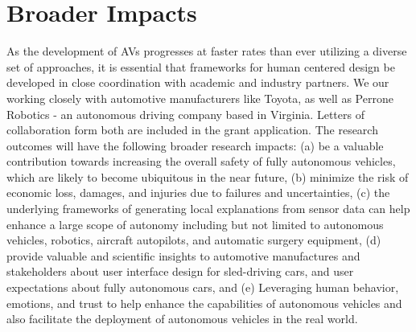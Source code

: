 

\section{Broader Impacts}
\label{sec:broader}

As the development of AVs progresses at faster rates than ever utilizing a diverse set of approaches, it is essential that frameworks for human centered design be developed in close coordination with academic and industry partners. 
We our working closely with automotive manufacturers like Toyota, as well as Perrone Robotics - an autonomous driving company based in Virginia. Letters of collaboration form both are included in the grant application.
The research outcomes will have the following broader research impacts: (a) be a valuable contribution towards increasing the overall safety of fully autonomous vehicles, which are likely to become ubiquitous in the near future, (b) minimize the risk of economic loss, damages, and injuries due to failures and uncertainties, (c) the underlying frameworks of generating local explanations from sensor data can help enhance a large scope of autonomy including but not limited to autonomous vehicles, robotics, aircraft autopilots, and automatic surgery equipment, (d) provide valuable and scientific insights to automotive manufactures and stakeholders about user interface design for sled-driving cars, and user expectations about fully autonomous cars, and (e) Leveraging human behavior, emotions, and trust to help enhance the capabilities of autonomous vehicles and also facilitate the deployment of autonomous vehicles in the real world.
